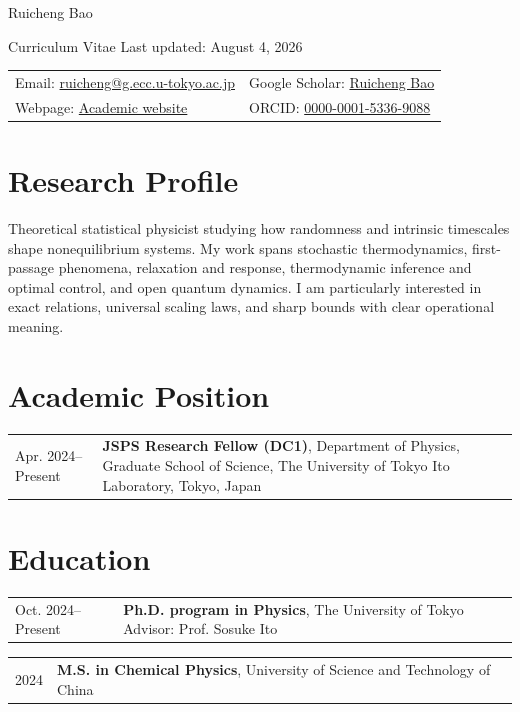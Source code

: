 \documentclass[10pt,a4paper]{article}
\makeatletter
\newcommand{\entry}[2]{%
  \begin{tabularx}{\textwidth}{@{}p{0.19\textwidth}X@{}}
    \color{muted}#1 & #2
  \end{tabularx}\par
}
\makeatother
\begin{document}
\begin{center}
  {\fontsize{27}{31}\selectfont Ruicheng Bao}\par
  \vspace{0.25em}
  {\small\color{muted}Curriculum Vitae \enspace\textbar\enspace Last updated: August 4, 2026}
\end{center}

\vspace{0.65em}
\begin{tabularx}{\textwidth}{@{}X X@{}}
  Email: \href{mailto:ruicheng@g.ecc.u-tokyo.ac.jp}{ruicheng@g.ecc.u-tokyo.ac.jp} &
  Google Scholar: \href{https://scholar.google.com/citations?user=ZSFCDtUAAAAJ}{Ruicheng Bao} \\
  Webpage: \href{https://ruichengbao.github.io/}{Academic website} &
  ORCID: \href{https://orcid.org/0000-0001-5336-9088}{0000-0001-5336-9088}
\end{tabularx}

\section{Research Profile}

Theoretical statistical physicist studying how randomness and intrinsic timescales shape nonequilibrium systems. My work spans stochastic thermodynamics, first-passage phenomena, relaxation and response, thermodynamic inference and optimal control, and open quantum dynamics. I am particularly interested in exact relations, universal scaling laws, and sharp bounds with clear operational meaning.

\section{Academic Position}

\entry{Apr. 2024--Present}{\textbf{JSPS Research Fellow (DC1)}, Department of Physics, Graduate School of Science, The University of Tokyo\newline
Ito Laboratory, Tokyo, Japan}

\section{Education}

\entry{Oct. 2024--Present}{\textbf{Ph.D. program in Physics}, The University of Tokyo\newline
Advisor: Prof. Sosuke Ito}

\entry{2024}{\textbf{M.S. in Chemical Physics}, University of Science and Technology of China}
\end{document}
